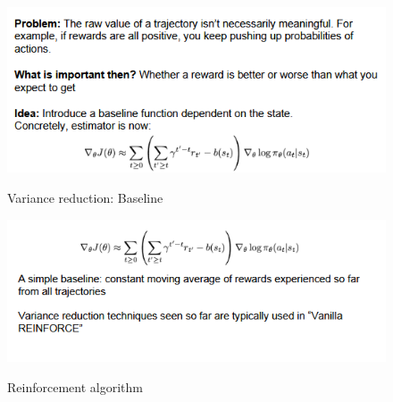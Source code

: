 \documentclass[11pt]{article}
\begin{document}
\begin{figure}[h]
\centering
\captionsetup{justification=centering}
\includegraphics[width=0.7\linewidth]{L1322.pdf}
\label{fig:1322}
\caption{Variance reduction: Baseline}
\end{figure}




\begin{figure}[h]
\centering
\captionsetup{justification=centering}
\includegraphics[width=0.7\linewidth]{L1323.pdf}
\label{fig:1323}
\caption{Reinforcement algorithm }
\end{figure}
\end{document}
